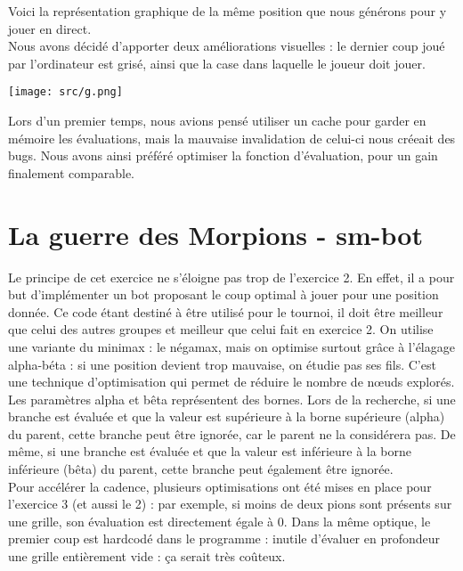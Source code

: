 \documentclass[14pt,a4paper]{article}
\begin{document}
Voici la représentation graphique de la même position que nous générons pour y jouer en direct.\\
Nous avons décidé d'apporter deux améliorations visuelles : le dernier coup joué par l'ordinateur est grisé, ainsi que la case dans laquelle le joueur doit jouer.

\begin{center}
    \texttt{[image: src/g.png]}
\end{center}

Lors d'un premier temps, nous avions pensé utiliser un cache pour garder en mémoire les évaluations, mais la mauvaise invalidation de celui-ci nous créeait des bugs. Nous avons ainsi préféré optimiser la fonction d'évaluation, pour un gain finalement comparable.

\newpage
\section{La guerre des Morpions - sm-bot}

Le principe de cet exercice ne s'éloigne pas trop de l'exercice 2. En effet, il a pour but d'implémenter un bot proposant le coup optimal à jouer pour une position donnée. Ce code étant destiné à être utilisé pour le tournoi, il doit être meilleur que celui des autres groupes et meilleur que celui fait en exercice 2.  On utilise une variante du minimax : le négamax, mais on optimise surtout grâce à l'élagage alpha-béta : si une position devient trop mauvaise, on étudie pas ses fils. C'est une technique d'optimisation qui permet de réduire le nombre de nœuds explorés. Les paramètres alpha et bêta représentent des bornes. Lors de la recherche, si une branche est évaluée et que la valeur est supérieure à la borne supérieure (alpha) du parent, cette branche peut être ignorée, car le parent ne la considérera pas. De même, si une branche est évaluée et que la valeur est inférieure à la borne inférieure (bêta) du parent, cette branche peut également être ignorée.\\

Pour accélérer la cadence, plusieurs optimisations ont été mises en place pour l'exercice 3 (et aussi le 2) : par exemple, si moins de deux pions sont présents sur une grille, son évaluation est directement égale à 0. Dans la même optique, le premier coup est hardcodé dans le programme : inutile d'évaluer en profondeur une grille entièrement vide : ça serait très coûteux.\\
\end{document}
